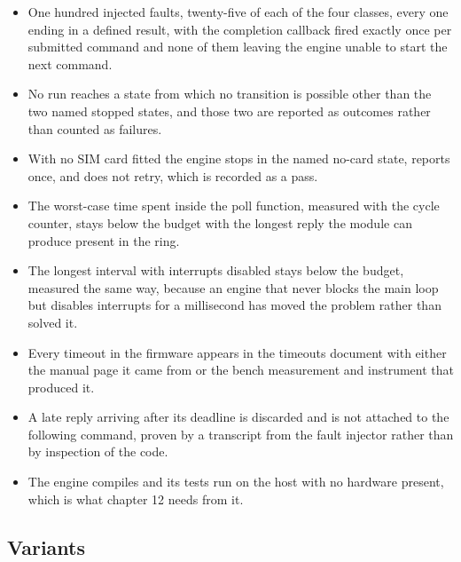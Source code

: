 \begin{itemize}
\item One hundred injected faults, twenty-five of each of the four classes,
every one ending in a defined result, with the completion callback fired exactly
once per submitted command and none of them leaving the engine unable to start
the next command.
\item No run reaches a state from which no transition is possible other than the
two named stopped states, and those two are reported as outcomes rather than
counted as failures.
\item With no SIM card fitted the engine stops in the named no-card state,
reports once, and does not retry, which is recorded as a pass.
\item The worst-case time spent inside the poll function, measured with the
cycle counter, stays below the budget with the longest reply the module can
produce present in the ring.
\item The longest interval with interrupts disabled stays below the budget,
measured the same way, because an engine that never blocks the main loop but
disables interrupts for a millisecond has moved the problem rather than solved
it.
\item Every timeout in the firmware appears in the timeouts document with either
the manual page it came from or the bench measurement and instrument that
produced it.
\item A late reply arriving after its deadline is discarded and is not attached
to the following command, proven by a transcript from the fault injector rather
than by inspection of the code.
\item The engine compiles and its tests run on the host with no hardware
present, which is what chapter 12 needs from it.
\end{itemize}

\subsection*{Variants}

